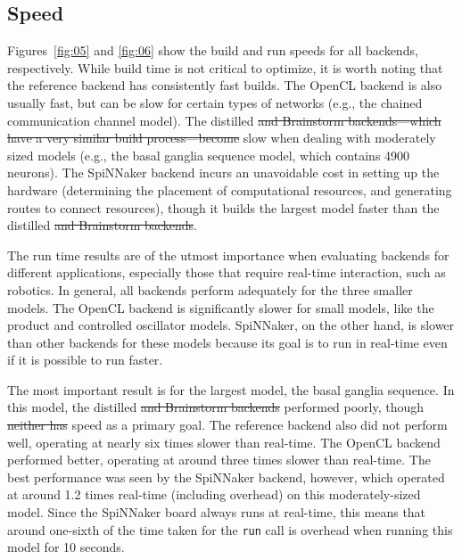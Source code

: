 \documentclass{frontiersSCNS}
\providecommand{\DIFadd}[1]{{\protect\color{blue}\uwave{#1}}} %
\providecommand{\DIFdel}[1]{{\protect\color{red}\sout{#1}}}                      %
\providecommand{\DIFaddbegin}{} %
\providecommand{\DIFaddend}{} %
\providecommand{\DIFdelbegin}{} %
\providecommand{\DIFdelend}{} %
\begin{document}
\subsection{Speed}

Figures~\ref{fig:05} and \ref{fig:06} show
the build and run speeds for all backends, respectively.
While build time is not critical to optimize,
it is worth noting that the reference backend
has consistently fast builds.
The OpenCL backend is also usually fast,
but can be slow for certain types of networks
(e.g., the chained communication channel model).
The distilled \DIFdelbegin \DIFdel{and Brainstorm backends---which
have a very similar build process---become
}\DIFdelend \DIFaddbegin \DIFadd{backend becomes
}\DIFaddend slow when dealing with moderately sized models
(e.g., the basal ganglia sequence model,
which contains 4900 neurons).
The SpiNNaker backend incurs an unavoidable cost
in setting up the hardware
(determining the placement of computational resources,
and generating routes to connect resources),
though it builds the largest model faster than
the distilled \DIFdelbegin \DIFdel{and Brainstorm backends}\DIFdelend \DIFaddbegin \DIFadd{backend}\DIFaddend .

The run time results are of the utmost importance
when evaluating backends for different applications,
especially those that require real-time interaction,
such as robotics. In general, all backends
perform adequately for the three smaller models.
The OpenCL backend is significantly slower for small
models, like the product and controlled oscillator models.
SpiNNaker, on the other hand, is slower than other backends
for these models because its goal
is to run in real-time even if it is possible to run faster.

The most important result is for the largest model,
the basal ganglia sequence.
In this model, the distilled \DIFdelbegin \DIFdel{and Brainstorm backends
}\DIFdelend \DIFaddbegin \DIFadd{backend
}\DIFaddend performed poorly,
though \DIFdelbegin \DIFdel{neither has }\DIFdelend \DIFaddbegin \DIFadd{it does not have }\DIFaddend speed as a primary goal.
The reference backend also did not perform well,
operating at nearly six times slower than real-time.
The OpenCL backend performed better, operating at around
three times slower than real-time.
The best performance was seen by the SpiNNaker backend,
however, which operated at around 1.2 times real-time
(including overhead) on this moderately-sized model.
Since the SpiNNaker board always runs at real-time,
this means that around one-sixth of the time taken
for the \texttt{run} call is overhead
when running this model for 10 seconds.
\end{document}
